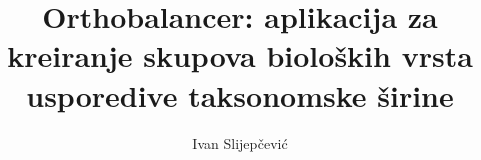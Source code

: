 \documentclass[times, utf8, zavrsni, numeric]{fer}
\begin{document}

\title{Orthobalancer: aplikacija za kreiranje skupova bioloških vrsta usporedive
taksonomske širine}

\author{Ivan Slijepčević}

\maketitle

\izvornik


\begin{sloppypar}
\tableofcontents
\end{sloppypar}





%








\begin{sazetak}

% 

\kljucnerijeci{}
\end{sazetak}

\clearpage

\begin{abstract}

% 

\keywords{}
\end{abstract}
\end{document}
